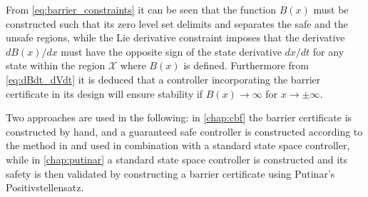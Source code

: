 From \autoref{eq:barrier_constraints} it can be seen that the function $B(x)$ must be constructed such that its zero level set delimits and separates the safe and the unsafe regions, while the Lie derivative constraint imposes that the derivative $dB(x)/dx$ must have the opposite sign of the state derivative $dx/dt$ for any state within the region $\mathcal{X}$ where $B(x)$ is defined. Furthermore from \autoref{eq:dBdt_dVdt} it is deduced that a controller incorporating the barrier certificate in its design will ensure stability if $B(x)\rightarrow \infty$ for $x\rightarrow \pm\infty$.

Two approaches are used in the following: in \autoref{chap:cbf} the barrier certificate is constructed by hand, and a guaranteed safe controller is constructed according to the method in \cite{bib:org_control} and used in combination with a standard state space controller, while in \autoref{chap:putinar} a standard state space controller is constructed and its safety is then validated by constructing a barrier certificate using Putinar's Positivstellensatz.











